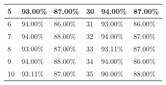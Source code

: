 \begin{table}[H]
\begin{tabular}{|l|l|l|l|l|l|}
		5  & 93.00\%                                                                                       & 87.00\%                                                                                         & 30 & 94.00\%                                                                                       & 87.00\%                                                                                         \\ \hline
		6  & 94.00\%                                                                                       & 86.00\%                                                                                         & 31 & 93.00\%                                                                                       & 86.00\%                                                                                         \\ \hline
		7  & 94.00\%                                                                                       & 88.00\%                                                                                         & 32 & 94.00\%                                                                                       & 87.00\%                                                                                         \\ \hline
		8  & 93.00\%                                                                                       & 87.00\%                                                                                         & 33 & 93.11\%                                                                                       & 87.00\%                                                                                         \\ \hline
		9  & 94.00\%                                                                                       & 88.00\%                                                                                         & 34 & 94.00\%                                                                                       & 86.00\%                                                                                         \\ \hline
		10 & 93.11\%                                                                                       & 87.00\%                                                                                         & 35 & 90.00\%                                                                                       & 88.00\%                                                                                         \\ \hline

\end{tabular}
\end{table}
